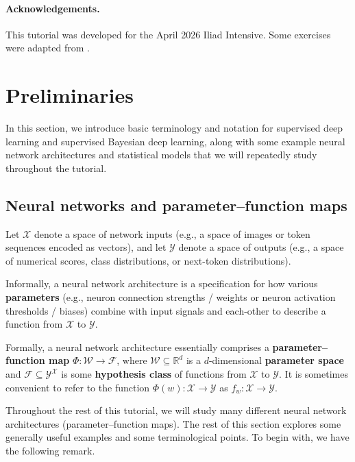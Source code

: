 \documentclass[11pt]{article}
\newcommand{\R}{\mathbb{R}}
\newcommand{\X}{\mathcal{X}}
\newcommand{\Y}{\mathcal{Y}}
\newcommand{\W}{\mathcal{W}}
\newcommand{\F}{\mathcal{F}}
\begin{document}
\paragraph{Acknowledgements.}

This tutorial was developed for the April 2026 Iliad Intensive.
Some exercises were adapted from \citet{Furman2024}.

\clearpage
\section{Preliminaries}
\label{sec:prelims}

In this section, we introduce basic terminology and notation for supervised
deep learning and supervised Bayesian deep learning, along with some example
neural network architectures and statistical models that we will repeatedly
study throughout the tutorial.

\subsection{Neural networks and parameter--function maps}

Let $\X$ denote a space of network inputs (e.g., a space of images or token
sequences encoded as vectors), and let $\Y$ denote a space of outputs (e.g., a
space of numerical scores, class distributions, or next-token distributions).

Informally, a neural network architecture is a specification for how various
\textbf{parameters} (e.g., neuron connection strengths / weights or neuron
activation thresholds / biases) combine with input signals and each-other to
describe a function from $\X$ to $\Y$.

Formally, a neural network architecture essentially comprises a
\textbf{parameter--function map}
    $\Phi : \W \to \F$, where
$\W \subseteq \R^d$ is a $d$-dimensional \textbf{parameter space} and 
$\F \subseteq \Y^\X$ is some \textbf{hypothesis class} of functions from $\X$
to $\Y$.
%
It is sometimes convenient to refer to the function $\Phi(w) : \X \to \Y$ as
$f_w : \X \to \Y$.

Throughout the rest of this tutorial, we will study many different neural
network architectures (parameter--function maps). The rest of this section
explores some generally useful examples and some terminological points. To
begin with, we have the following remark.
\end{document}

